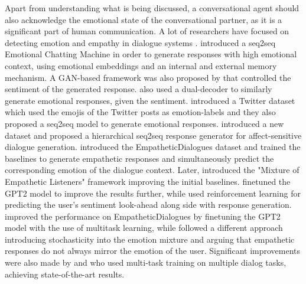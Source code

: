 \documentclass[11pt]{article}
\begin{document}
Apart from understanding what is being discussed, a conversational agent should also acknowledge the emotional state of the conversational partner, as it is a significant part of human communication. A lot of researchers have focused on detecting emotion \citep{fan_2018a_cnn_facial_expr,xu_2018_emo2vec,winata_2017,winata_2019} and empathy in dialogue systems \citep{bertero_2016_real_sent_rec,chatterjee_2019_a}. \citealp{zhou_2017_emotional_chat_machine} introduced a seq2seq \citep{seq_to_seq_learning_nn} Emotional Chatting Machine in order to generate responses with high emotional context, using emotional embeddings and an internal and external memory mechanism. A GAN-based \citep{goodfellow_2014_gan} framework was also proposed by \citealp{wang_wan_2018_sentigan} that controlled the sentiment of the generated response. \citealp{wu_2019_dual_encoder} also used a dual-decoder to similarly generate emotional responses, given the sentiment.  \citealp{zhou_wang_2017_mojitalk} introduced a Twitter dataset which used  the emojis of the Twitter posts as emotion-labels and they also proposed a seq2seq model to generate emotional responses. \citealp{lubis_2018_eliciting_pos_em} introduced a new dataset and proposed a hierarchical seq2seq response generator for affect-sensitive dialogue generation. \citealp{rashkin_2018_empathetic_dataset} introduced the EmpatheticDialogues dataset and trained the baselines to generate empathetic responses and simultaneously predict the corresponding emotion of the dialogue context. Later, \citealp{lin_2019_moel} introduced the "Mixture of Empathetic Listeners" framework improving the initial baselines. \citealp{santhanam_2019_emotional_nlg} finetuned the GPT2 \citep{Radford_2019_openai_gpt2} model to improve the results further, while \citealp{Shin_2019_happybot} used reinforcement learning for predicting the user's sentiment look-ahead along side with response generation. %
\citealp{lin_2019_caire_empathetic_chatbot}  improved the performance on EmpatheticDialogues by finetuning the GPT2 model with the use of multitask learning, while \citealp{majumder_2020_mime} followed a different approach introducing stochasticity into the emotion mixture and arguing that empathetic responses do not always mirror the emotion of the user. Significant improvements were also made by \citealp{roller_2020_fb_recipes_blender} and \citealp{shuster_2019_dodeca_dialogues} who used multi-task training on multiple dialog tasks, achieving state-of-the-art results.
\end{document}
